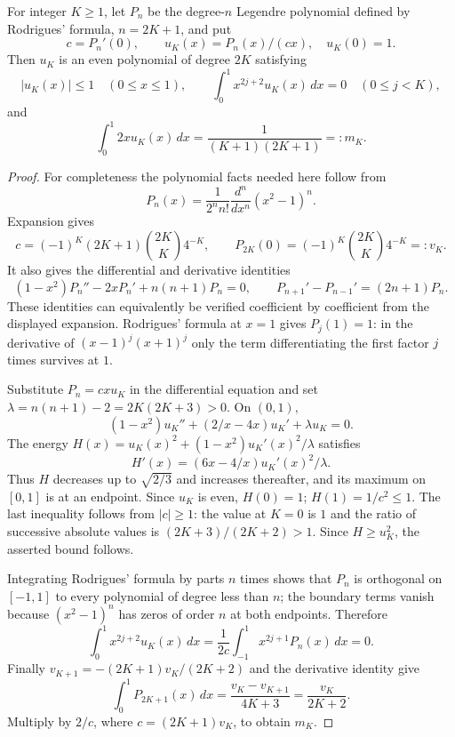 \begin{lemma}\label{lem:poly}
For integer $K\ge1$, let $P_n$ be the degree-$n$ Legendre polynomial defined
by Rodrigues' formula, $n=2K+1$, and put
\[
 c=P_n'(0),\qquad u_K(x)=P_n(x)/(cx),\quad u_K(0)=1.
\]
Then $u_K$ is an even polynomial of degree $2K$ satisfying
\[
 |u_K(x)|\le1\quad(0\le x\le1),\qquad
 \int_0^1x^{2j+2}u_K(x)\,dx=0\quad(0\le j<K),
\]
and
\[
 \int_0^1 2x u_K(x)\,dx=\frac1{(K+1)(2K+1)}=:m_K.
\]
\end{lemma}
\begin{proof}
For completeness the polynomial facts needed here follow from
\[
 P_n(x)=\frac1{2^n n!}\frac{d^n}{dx^n}(x^2-1)^n.
\]
Expansion gives
\[
 c=(-1)^K(2K+1){\binom{2K}{K}}4^{-K},\qquad
 P_{2K}(0)=(-1)^K\binom{2K}{K}4^{-K}=:v_K.
\]
It also gives the differential and derivative identities
\[
 (1-x^2)P_n''-2xP_n'+n(n+1)P_n=0,
 \qquad P_{n+1}'-P_{n-1}'=(2n+1)P_n.
\]
These identities can equivalently be verified coefficient by coefficient
from the displayed expansion. Rodrigues' formula at $x=1$ gives $P_j(1)=1$:
in the derivative of $(x-1)^j(x+1)^j$ only the term differentiating the first
factor $j$ times survives at $1$.

Substitute $P_n=cxu_K$ in the differential equation and set
$\lambda=n(n+1)-2=2K(2K+3)>0$. On $(0,1)$,
\[
 (1-x^2)u_K''+(2/x-4x)u_K'+\lambda u_K=0.
\]
The energy $H(x)=u_K(x)^2+(1-x^2)u_K'(x)^2/\lambda$ satisfies
\[
 H'(x)=(6x-4/x)u_K'(x)^2/\lambda.
\]
Thus $H$ decreases up to $\sqrt{2/3}$ and increases thereafter, and its
maximum on $[0,1]$ is at an endpoint. Since $u_K$ is even, $H(0)=1$;
$H(1)=1/c^2\le1$. The last inequality follows from $|c|\ge1$: the value
at $K=0$ is $1$ and the ratio of successive absolute values is
$(2K+3)/(2K+2)>1$. Since $H\ge u_K^2$, the asserted bound follows.

Integrating Rodrigues' formula by parts $n$ times shows that $P_n$ is
orthogonal on $[-1,1]$ to every polynomial of degree less than $n$; the
boundary terms vanish because $(x^2-1)^n$ has zeros of order $n$ at both
endpoints. Therefore
\[
 \int_0^1x^{2j+2}u_K(x)\,dx
 =\frac1{2c}\int_{-1}^1x^{2j+1}P_n(x)\,dx=0.
\]
Finally $v_{K+1}=-(2K+1)v_K/(2K+2)$ and the derivative identity give
\[
 \int_0^1P_{2K+1}(x)\,dx
 =\frac{v_K-v_{K+1}}{4K+3}=\frac{v_K}{2K+2}.
\]
Multiply by $2/c$, where $c=(2K+1)v_K$, to obtain $m_K$.
\end{proof}


